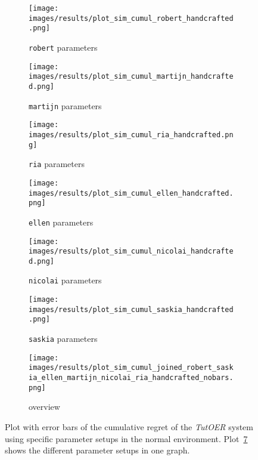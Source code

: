 \begin{figure}[ht]
	\begin{subfigure}{0.48\linewidth}
	\texttt{[image: images/results/plot\_sim\_cumul\_robert\_handcrafted.png]}
	\caption{\texttt{robert} parameters}
	\label{fig:cumul_handcrafted_robert}
	\end{subfigure}
	\hfill
	\begin{subfigure}{0.48\linewidth}
	\texttt{[image: images/results/plot\_sim\_cumul\_martijn\_handcrafted.png]}
	\caption{\texttt{martijn} parameters}
	\label{fig:cumul_handcrafted_martijn}
	\end{subfigure}
	\begin{subfigure}{0.48\linewidth}
	\texttt{[image: images/results/plot\_sim\_cumul\_ria\_handcrafted.png]}
	\caption{\texttt{ria} parameters}
	\label{fig:cumul_handcrafted_ria}
	\end{subfigure}
	\hfill
	\begin{subfigure}{0.48\linewidth}
	\texttt{[image: images/results/plot\_sim\_cumul\_ellen\_handcrafted.png]}
	\caption{\texttt{ellen} parameters}
	\label{fig:cumul_handcrafted_ellen}
	\end{subfigure}
	\begin{subfigure}{0.48\linewidth}
	\texttt{[image: images/results/plot\_sim\_cumul\_nicolai\_handcrafted.png]}
	\caption{\texttt{nicolai} parameters}
	\label{fig:cumul_handcrafted_nicolai}
	\end{subfigure}
	\hfill
	\begin{subfigure}{0.48\linewidth}
	\texttt{[image: images/results/plot\_sim\_cumul\_saskia\_handcrafted.png]}
	\caption{\texttt{saskia} parameters}
	\label{fig:cumul_handcrafted_saskia}
	\end{subfigure}
	\begin{subfigure}{\linewidth}
	\texttt{[image: images/results/plot\_sim\_cumul\_joined\_robert\_saskia\_ellen\_martijn\_nicolai\_ria\_handcrafted\_nobars.png]}
	\caption{overview}
	\label{fig:cumul_handcrafted_overview_group2}
	\end{subfigure}
	\caption[Cumulative regret in normal simulated environment for group 2]{Plot with error bars of the cumulative regret of the \emph{TutOER}
	system using specific parameter setups in the normal environment.
	Plot~\ref{fig:cumul_handcrafted_overview_group2} shows the
	different parameter setups in one graph.}
	\label{fig:cumul_handcrafted_container_group2}
\end{figure}

